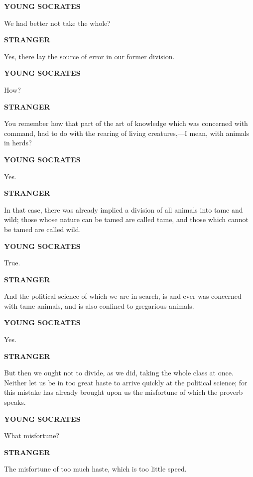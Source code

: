 \documentclass[11pt,letter]{article}
\begin{document}
\par \textbf{YOUNG SOCRATES}
\par   We had better not take the whole?

\par \textbf{STRANGER}
\par   Yes, there lay the source of error in our former division.

\par \textbf{YOUNG SOCRATES}
\par   How?

\par \textbf{STRANGER}
\par   You remember how that part of the art of knowledge which was concerned with command, had to do with the rearing of living creatures,—I mean, with animals in herds?

\par \textbf{YOUNG SOCRATES}
\par   Yes.

\par \textbf{STRANGER}
\par   In that case, there was already implied a division of all animals into tame and wild; those whose nature can be tamed are called tame, and those which cannot be tamed are called wild.

\par \textbf{YOUNG SOCRATES}
\par   True.

\par \textbf{STRANGER}
\par   And the political science of which we are in search, is and ever was concerned with tame animals, and is also confined to gregarious animals.

\par \textbf{YOUNG SOCRATES}
\par   Yes.

\par \textbf{STRANGER}
\par   But then we ought not to divide, as we did, taking the whole class at once. Neither let us be in too great haste to arrive quickly at the political science; for this mistake has already brought upon us the misfortune of which the proverb speaks.

\par \textbf{YOUNG SOCRATES}
\par   What misfortune?

\par \textbf{STRANGER}
\par   The misfortune of too much haste, which is too little speed.
\end{document}

